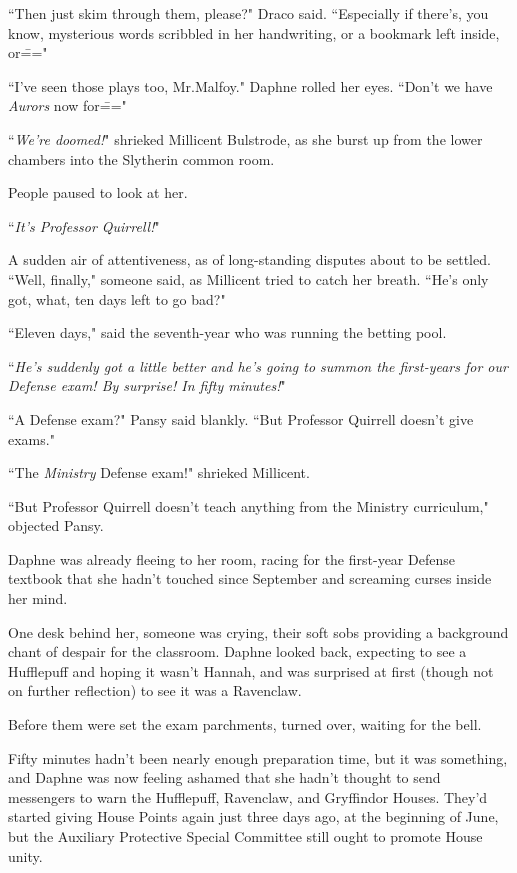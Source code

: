 ``Then just skim through them, please?" Draco said. ``Especially if there's, you know, mysterious words scribbled in her handwriting, or a bookmark left inside, or\==="

``I've seen those plays too, Mr.\?Malfoy." Daphne rolled her eyes. ``Don't we have \emph{Aurors} now for\==="

``\emph{We're doomed!}" shrieked Millicent Bulstrode, as she burst up from the lower chambers into the Slytherin common room.

People paused to look at her.

``\emph{It's Professor Quirrell!}"

A sudden air of attentiveness, as of long-standing disputes about to be settled. ``Well, finally," someone said, as Millicent tried to catch her breath. ``He's only got, what, ten days left to go bad?"

``Eleven days," said the seventh-year who was running the betting pool.

``\emph{He's suddenly got a little better and he's going to summon the first-years for our Defense exam! By surprise! In fifty minutes!}"

``A Defense exam?" Pansy said blankly. ``But Professor Quirrell doesn't give exams."

``The \emph{Ministry} Defense exam!" shrieked Millicent.

``But Professor Quirrell doesn't teach anything from the Ministry curriculum," objected Pansy.

Daphne was already fleeing to her room, racing for the first-year Defense textbook that she hadn't touched since September and screaming curses inside her mind.

\later

One desk behind her, someone was crying, their soft sobs providing a background chant of despair for the classroom. Daphne looked back, expecting to see a Hufflepuff and hoping it wasn't Hannah, and was surprised at first (though not on further reflection) to see it was a Ravenclaw.

Before them were set the exam parchments, turned over, waiting for the bell.

Fifty minutes hadn't been nearly enough preparation time, but it was something, and Daphne was now feeling ashamed that she hadn't thought to send messengers to warn the Hufflepuff, Ravenclaw, and Gryffindor Houses. They'd started giving House Points again just three days ago, at the beginning of June, but the Auxiliary Protective Special Committee still ought to promote House unity.

